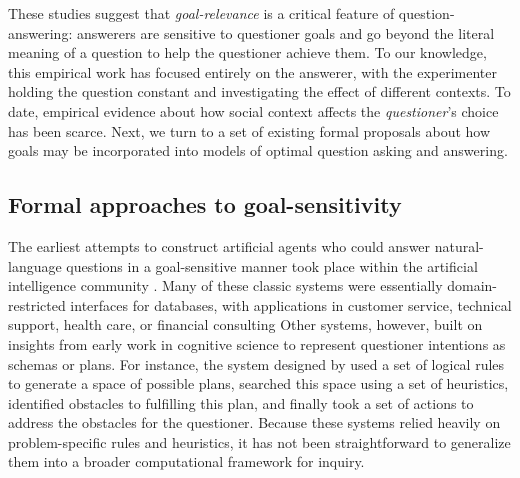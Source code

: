 \documentclass[11pt, floatsintext]{apa6}
\begin{document}



These studies suggest that \emph{goal-relevance} is a critical feature of question-answering: answerers are sensitive to questioner goals and go beyond the literal meaning of a question to help the questioner achieve them. 
To our knowledge, this empirical work has focused entirely on the answerer, with the experimenter holding the question constant and investigating the effect of different contexts. 
To date, empirical evidence about how social context affects the \emph{questioner}'s choice has been scarce. 
Next, we turn to a set of existing formal proposals about how goals may be incorporated into models of optimal question asking and answering.

\subsection{Formal approaches to goal-sensitivity}

The earliest attempts to construct artificial agents who could answer natural-language questions in a goal-sensitive manner took place within the artificial intelligence community \cite{Simmons65_QuestionsComputer, Lehnert77_QuestionAnswering, AllenPerrault80_IntentionUtterances, GreenCarberry94_IndirectAnswersModel, MollaVicedo07_QARestrictedDomains}. 
Many of these classic systems were essentially domain-restricted interfaces for databases, with applications in customer service, technical support, health care, or financial consulting
Other systems, however, built on insights from early work in cognitive science to represent questioner intentions as schemas or plans. 
For instance, the system designed by  used a set of logical rules to generate a space of possible plans, searched this space using a set of heuristics, identified obstacles to fulfilling this plan, and finally took a set of actions to address the obstacles for the questioner. 
Because these systems relied heavily on problem-specific rules and heuristics, it has not been straightforward to generalize them into a broader computational framework for inquiry.
\end{document}
